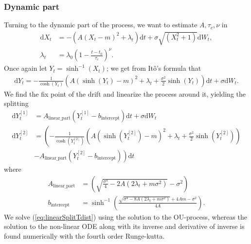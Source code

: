 \subsubsection{Dynamic part}
Turning to the dynamic part of the process, we want to estimate $A, \tau_c, \nu$ in
\begin{align}
    \mathrm{d}X_t &= -\left(A(X_t - m)^2 + \lambda_t\right)\mathrm{d}t + \sigma \sqrt{\left(X_t^2 + 1\right)}\mathrm{d}W_t,\\
    \lambda_t &= \lambda_0 \left(1 - \frac{t - t_0}{\tau_c}\right)^\nu.
\end{align}
Once again let $Y_t = \sinh^{-1}(X_t)$; we get from Itô's formula that
\begin{align}
    \mathrm{d}Y_t = -\frac{1}{\cosh(Y_t)}\left(A\left(\sinh(Y_t) - m\right)^2 + \lambda_t + \frac{\sigma^2}{2}\sinh(Y_t)\right)\mathrm{d}t + \sigma \mathrm{d}W_t.
\end{align}
We find the fix point of the drift and linearize the process around it, yielding the splitting
\begin{align}
    \mathrm{d}Y_t^{[1]} &= A_{\textrm{linear\_part}}\left(Y_t^{[1]} - b_{\textrm{intercept}}\right)\mathrm{d}t + \sigma \mathrm{d}W_t \label{eq:linearSplitTdist} \\
    \mathrm{d}Y_t^{[2]} &= \left(-\frac{1}{\cosh(Y_t^{[2]})}\left(A\left(\sinh(Y_t^{[2]}) - m\right)^2 + \lambda_t + \frac{\sigma^2}{2}\sinh(Y_t^{[2]})\right)\right.\\
     &\left.- A_{\textrm{linear\_part}}\left(Y_t^{[2]} - b_{\textrm{intercept}}\right)\right)\mathrm{d}t
\end{align}
where 
\begin{align}
    A_{\textrm{linear\_part}} &= \left(\sqrt{\frac{\sigma^4}{4} - 2A\left(2\lambda_t + m\sigma^2\right)}-\sigma^2\right)\\
    b_{\textrm{intercept}} &= \sinh^{-1}\left(\frac{\sqrt{\sigma^4 - 8A\left(2\lambda_t + m \sigma^2\right)} + 4 Am - \sigma^2}{4A}\right).
\end{align}
We solve (\ref{eq:linearSplitTdist}) using the solution to the OU-process, whereas the solution to the non-linear ODE along with its inverse and derivative of inverse is found numerically with the fourth order Runge-kutta.
